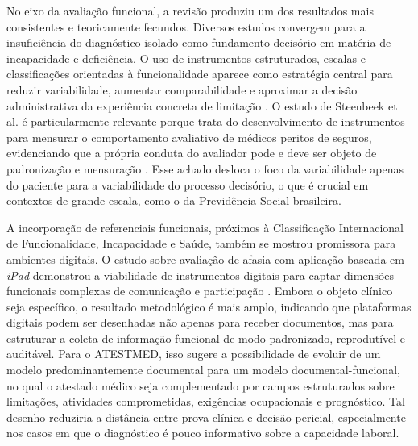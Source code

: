\documentclass[12pt,a4paper]{article}
\begin{document}
No eixo da avaliação funcional, a revisão produziu um dos resultados mais consistentes e teoricamente fecundos. Diversos estudos convergem para a insuficiência do diagnóstico isolado como fundamento decisório em matéria de incapacidade e deficiência. O uso de instrumentos estruturados, escalas e classificações orientadas à funcionalidade aparece como estratégia central para reduzir variabilidade, aumentar comparabilidade e aproximar a decisão administrativa da experiência concreta de limitação \parencite{steenbeek2011thedevelopmentofinstrumentstomeasuretheworkdisa, guo2017assessmentofaphasiaacrosstheinternationalclassification, feudtner2014pediatriccomplexchronicconditionsclassificationsyst}. O estudo de Steenbeek et al. é particularmente relevante porque trata do desenvolvimento de instrumentos para mensurar o comportamento avaliativo de médicos peritos de seguros, evidenciando que a própria conduta do avaliador pode e deve ser objeto de padronização e mensuração \parencite{steenbeek2011thedevelopmentofinstrumentstomeasuretheworkdisa}. Esse achado desloca o foco da variabilidade apenas do paciente para a variabilidade do processo decisório, o que é crucial em contextos de grande escala, como o da Previdência Social brasileira.

A incorporação de referenciais funcionais, próximos à Classificação Internacional de Funcionalidade, Incapacidade e Saúde, também se mostrou promissora para ambientes digitais. O estudo sobre avaliação de afasia com aplicação baseada em \textit{iPad} demonstrou a viabilidade de instrumentos digitais para captar dimensões funcionais complexas de comunicação e participação \parencite{guo2017assessmentofaphasiaacrosstheinternationalclassification}. Embora o objeto clínico seja específico, o resultado metodológico é mais amplo, indicando que plataformas digitais podem ser desenhadas não apenas para receber documentos, mas para estruturar a coleta de informação funcional de modo padronizado, reprodutível e auditável. Para o ATESTMED, isso sugere a possibilidade de evoluir de um modelo predominantemente documental para um modelo documental-funcional, no qual o atestado médico seja complementado por campos estruturados sobre limitações, atividades comprometidas, exigências ocupacionais e prognóstico. Tal desenho reduziria a distância entre prova clínica e decisão pericial, especialmente nos casos em que o diagnóstico é pouco informativo sobre a capacidade laboral.
\end{document}
